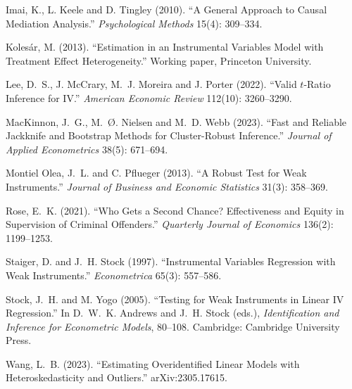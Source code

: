 \documentclass[11pt]{article}
\begin{document}
\begin{description}
  \item Imai, K., L. Keele and D. Tingley (2010). ``A General Approach to Causal Mediation Analysis.'' \emph{Psychological Methods} 15(4): 309--334.
  \item Kolesár, M. (2013). ``Estimation in an Instrumental Variables Model with Treatment Effect Heterogeneity.'' Working paper, Princeton University.
  \item Lee, D.~S., J. McCrary, M.~J. Moreira and J. Porter (2022). ``Valid $t$-Ratio Inference for IV.'' \emph{American Economic Review} 112(10): 3260--3290.
  \item MacKinnon, J.~G., M.~Ø. Nielsen and M.~D. Webb (2023). ``Fast and Reliable Jackknife and Bootstrap Methods for Cluster-Robust Inference.'' \emph{Journal of Applied Econometrics} 38(5): 671--694.
  \item Montiel Olea, J.~L. and C. Pflueger (2013). ``A Robust Test for Weak Instruments.'' \emph{Journal of Business and Economic Statistics} 31(3): 358--369.
  \item Rose, E.~K. (2021). ``Who Gets a Second Chance? Effectiveness and Equity in Supervision of Criminal Offenders.'' \emph{Quarterly Journal of Economics} 136(2): 1199--1253.
  \item Staiger, D. and J.~H. Stock (1997). ``Instrumental Variables Regression with Weak Instruments.'' \emph{Econometrica} 65(3): 557--586.
  \item Stock, J.~H. and M. Yogo (2005). ``Testing for Weak Instruments in Linear IV Regression.'' In D.~W.~K. Andrews and J.~H. Stock (eds.), \emph{Identification and Inference for Econometric Models}, 80--108. Cambridge: Cambridge University Press.
  \item Wang, L.~B. (2023). ``Estimating Overidentified Linear Models with Heteroskedasticity and Outliers.'' arXiv:2305.17615.
\end{description}
\end{document}
